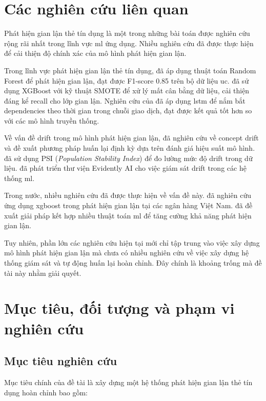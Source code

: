 \section{Các nghiên cứu liên quan}

Phát hiện gian lận thẻ tín dụng là một trong những bài toán được nghiên cứu rộng rãi nhất trong lĩnh vực \ac{ml} ứng dụng. Nhiều nghiên cứu đã được thực hiện để cải thiện độ chính xác của mô hình phát hiện gian lận.

Trong lĩnh vực phát hiện gian lận thẻ tín dụng, \cite{creditcard1} đã áp dụng thuật toán Random Forest để phát hiện gian lận, đạt được F1-score 0.85 trên bộ dữ liệu \ac{uc}. \cite{xgboost_fraud} đã sử dụng XGBoost với kỹ thuật SMOTE để xử lý mất cân bằng dữ liệu, cải thiện đáng kể recall cho lớp gian lận. Nghiên cứu của \cite{deep_learning_fraud} đã áp dụng \ac{lstm} để nắm bắt dependencies theo thời gian trong chuỗi giao dịch, đạt được kết quả tốt hơn so với các mô hình truyền thống.

Về vấn đề drift trong mô hình phát hiện gian lận, \cite{drift1} đã nghiên cứu về concept drift và đề xuất phương pháp huấn lại định kỳ dựa trên đánh giá hiệu suất mô hình. \cite{drift2} đã sử dụng PSI (\textit{Population Stability Index}) để đo lường mức độ drift trong dữ liệu. \cite{evidently_2023} đã phát triển thư viện Evidently AI cho việc giám sát drift trong các hệ thống \ac{ml}.

Trong nước, nhiều nghiên cứu đã được thực hiện về vấn đề này. \cite{vietnam1} đã nghiên cứu ứng dụng \ac{xgboost} trong phát hiện gian lận tại các ngân hàng Việt Nam. \cite{vietnam2} đã đề xuất giải pháp kết hợp nhiều thuật toán \ac{ml} để tăng cường khả năng phát hiện gian lận.

Tuy nhiên, phần lớn các nghiên cứu hiện tại mới chỉ tập trung vào việc xây dựng mô hình phát hiện gian lận mà chưa có nhiều nghiên cứu về việc xây dựng hệ thống giám sát và tự động huấn lại hoàn chỉnh. Đây chính là khoảng trống mà đề tài này nhằm giải quyết.

\section{Mục tiêu, đối tượng và phạm vi nghiên cứu}
\subsection{Mục tiêu nghiên cứu}
\label{sec:MucTieu}

Mục tiêu chính của đề tài là xây dựng một hệ thống phát hiện gian lận thẻ tín dụng hoàn chỉnh bao gồm:

